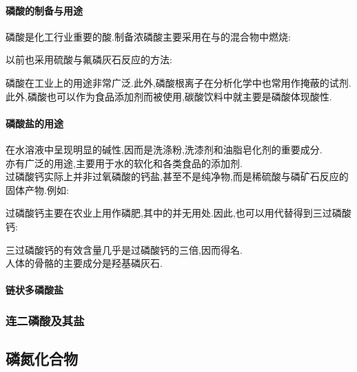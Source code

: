 \documentclass{ctexart}
\begin{document}
\paragraph{磷酸的制备与用途}
磷酸是化工行业重要的酸.制备浓磷酸主要采用在与的混合物中燃烧:
\begin{center}
\end{center}
以前也采用硫酸与氟磷灰石反应的方法:
\begin{center}
\end{center}
磷酸在工业上的用途非常广泛.此外,磷酸根离子在分析化学中也常用作掩蔽的试剂.此外,磷酸也可以作为食品添加剂而被使用,碳酸饮料中就主要是磷酸体现酸性.
\paragraph{磷酸盐的用途}
在水溶液中呈现明显的碱性,因而是洗涤粉,洗漆剂和油脂皂化剂的重要成分.\\
\indent{}亦有广泛的用途,主要用于水的软化和各类食品的添加剂.\\
\indent 过磷酸钙实际上并非过氧磷酸的钙盐,甚至不是纯净物,而是稀硫酸与磷矿石反应的固体产物.例如:
\begin{center}
\end{center}
过磷酸钙主要在农业上用作磷肥,其中的并无用处.因此,也可以用代替得到三过磷酸钙:
\begin{center}
\end{center}
三过磷酸钙的有效含量几乎是过磷酸钙的三倍,因而得名.\\
\indent 人体的骨骼的主要成分是羟基磷灰石.
\paragraph{链状多磷酸盐}

\subsubsection{连二磷酸及其盐}

\subsection{磷氮化合物}
\end{document}
